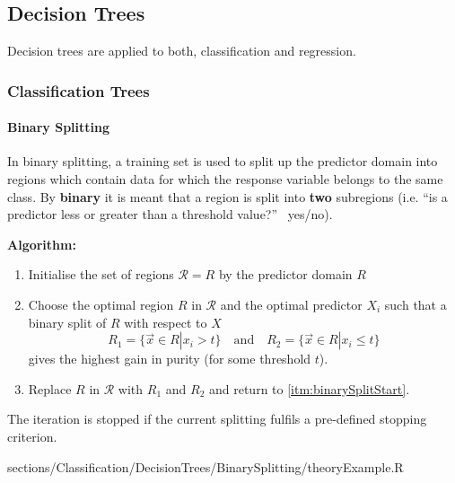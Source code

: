\subsection{Decision Trees}

	Decision trees are applied to both, classification and regression.	

	\subsubsection{Classification Trees}	
		\paragraph{Binary Splitting}
			In binary splitting, a training set is used to split up the predictor domain into regions which contain data for which the response variable belongs to the same class. By \textbf{binary} it is meant that a region is split into \textbf{two} subregions (i.e. ``is a predictor less or greater than a threshold value?'' \textrightarrow\ yes/no).
			
			\RTheory
			{
				\textbf{Algorithm:}
				\begin{enumerate}
				  	\item Initialise the set of regions $\mathcal{R} = {R}$ by the predictor domain $R$
				  	\item\label{itm:binarySplitStart}  Choose the optimal region $R$ in $\mathcal{R}$ and the optimal predictor $X_i$ such that a binary split of $R$ with respect to $X$
						$$R_1 = \{\vec{x} \in R | x_i > t\} \quad\mathrm{and}\quad R_2 = \{\vec{x} \in R | x_i \leq t\}$$
						gives the highest gain in purity (for some threshold $t$).
					\item Replace $R$ in $\mathcal{R}$ with $R_1$ and $R_2$ and return to \ref{itm:binarySplitStart}.
				\end{enumerate}
				
				The iteration is stopped if the current splitting fulfils a pre-defined stopping criterion.
				
			}
			{
				sections/Classification/DecisionTrees/BinarySplitting/theoryExample.R
			}
			

